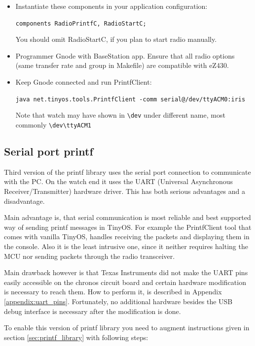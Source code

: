 \begin{itemize}
  \item Instantiate these components in your application configuration:

  \texttt{components RadioPrintfC, RadioStartC;}

  You should omit RadioStartC, if you plan to start radio manually.

  \item Programmer Gnode with BaseStation app. Ensure that all radio options (same transfer rate and group in Makefile) are compatible with eZ430.

  \item Keep Gnode connected and run PrintfClient:

  \texttt{java net.tinyos.tools.PrintfClient -comm serial@/dev/ttyACM0:iris}

  Note that watch may have shown in \texttt{\textbackslash dev} under
  different name, most commonly
  \texttt{\textbackslash dev\textbackslash ttyACM1}
\end{itemize}

\subsection{Serial port printf}
Third version of the printf library uses the serial port connection to
communicate with the PC. On the watch end it uses the UART (Universal
Asynchronous Receiver/Transmitter) hardware driver. This has both
serious advantages and a disadvantage.

Main advantage is, that serial communication is most reliable and best
supported way of sending printf messages in TinyOS. For example the
PrintfClient tool that comes with vanilla TinyOS, handles receiving
the packets and displaying them in the console. Also it is the least
intrusive one, since it neither requires halting the MCU nor sending
packets through the radio transceiver.

Main drawback however is that Texas Instruments did not make the UART
pins easily accessible on the chronos circuit board and certain
hardware modification is necessary to reach them. How to perform it,
is described in Appendix \ref{appendix:uart_pins}. Fortunately, no
additional hardware besides the USB debug interface is necessary after
the modification is done.

To enable this version of printf library you need to augment
instructions given in section \ref{sec:printf_library} with following
steps:

